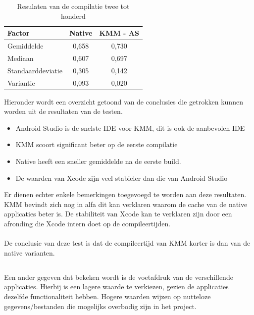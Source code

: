 \begin{table}[H]
    \centering
    \caption{Resulaten van de compilatie twee tot honderd}
    \begin{tabular}{|l|c|c|}
        \hline
        {\textbf{Factor}} & {\textbf{Native}}  & {\textbf{KMM - AS}}\\ \hline \hline
        Gemiddelde&0,658&0,730\\ \hline
        Mediaan&0,607&0,697\\ \hline
        Standaarddeviatie&0,305&0,142\\ \hline
        Variantie&0,093&0,020\\ \hline
    \end{tabular}
    \label{T:compileer-andere-overzicht}
\end{table}

Hieronder wordt een overzicht getoond van de conclusies die getrokken kunnen worden uit de resultaten van de testen.
\begin{itemize}
    \item Android Studio is de snelste IDE voor KMM, dit is ook de aanbevolen IDE
    \item KMM scoort significant beter op de eerste compilatie
    \item Native heeft een sneller gemiddelde na de eerste build.
    \item De waarden van Xcode zijn veel stabieler dan die van Android Studio
\end{itemize}
Er dienen echter enkele bemerkingen toegevoegd te worden aan deze resultaten. KMM bevindt zich nog in alfa dit kan verklaren waarom de cache van de native applicaties beter is. De stabiliteit van Xcode kan te verklaren zijn door een afronding die Xcode intern doet op de compileertijden.
\\ \\ 
De conclusie van deze test is dat de compileertijd van KMM korter is dan van de native varianten. 


\subsection{}
\label{sec:M-test-voetafdruk}
Een ander gegeven dat bekeken wordt is de voetafdruk van de verschillende applicaties. Hierbij is een lagere waarde te verkiezen,  gezien de applicaties dezelfde functionaliteit hebben. Hogere waarden wijzen op nutteloze gegevens/bestanden die mogelijks overbodig zijn in het project.


